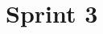 \section{Sprint 3}


\begin{comment}
The past week, four variable pitch assemblies has been made with trex-500 tails. We hoped that we would
have more progress by now, but things have taken time. However we’ve almost finished the first version
of a basic flight controller. We have achieved communication with qualisys to the off-board computer.
We’ve almost finished the computation to find the angles roll, pitch and yaw. We’ve achieved communication
between the off-board and on-board flight controller. The on-board chip will receive these angles
and run the inner control loop for stabilization at these set-points. Our aim is to have this finished as
soon as possible, so we can start testing the code. Additionally, a document describing the mathematics
of fixed pitch quadcopters has been made, and variable pitch mathematics is underway.
We have completed 78%
this for the next sprint.

\end{comment}
